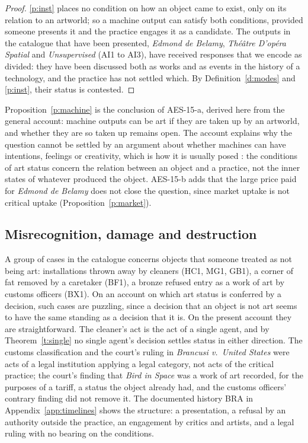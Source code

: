 \documentclass{situationist-preprint}
\begin{document}
\begin{proof}
\ref{p:inst} places no condition on how an object came to exist, only on its relation to an artworld; so a machine output can satisfy both conditions, provided someone presents it and the practice engages it as a candidate. The outputs in the catalogue that have been presented, \emph{Edmond de Belamy}, \emph{Th\'e\^atre D'op\'era Spatial} and \emph{Unsupervised} (AI1 to AI3), have received responses that we encode as divided: they have been discussed both as works and as events in the history of a technology, and the practice has not settled which. By Definition~\ref{d:modes} and \ref{p:inst}, their status is contested.
\end{proof}

Proposition~\ref{p:machine} is the conclusion of AES-15-a, derived here from the general account: machine outputs can be art if they are taken up by an artworld, and whether they are so taken up remains open. The account explains why the question cannot be settled by an argument about whether machines can have intentions, feelings or creativity, which is how it is usually posed \citep{Boden2010,Hertzmann2018}: the conditions of art status concern the relation between an object and a practice, not the inner states of whatever produced the object. AES-15-b adds that the large price paid for \emph{Edmond de Belamy} does not close the question, since market uptake is not critical uptake (Proposition~\ref{p:market}).

\subsection{Misrecognition, damage and destruction}

A group of cases in the catalogue concerns objects that someone treated as not being art: installations thrown away by cleaners (HC1, MG1, GB1), a corner of fat removed by a caretaker (BF1), a bronze refused entry as a work of art by customs officers (BX1). On an account on which art status is conferred by a decision, such cases are puzzling, since a decision that an object is not art seems to have the same standing as a decision that it is. On the present account they are straightforward. The cleaner's act is the act of a single agent, and by Theorem~\ref{t:single} no single agent's decision settles status in either direction. The customs classification and the court's ruling in \emph{Brancusi v.\ United States} were acts of a legal institution applying a legal category, not acts of the critical practice; the court's finding that \emph{Bird in Space} was a work of art recorded, for the purposes of a tariff, a status the object already had, and the customs officers' contrary finding did not remove it. The documented history BRA in Appendix~\ref{app:timelines} shows the structure: a presentation, a refusal by an authority outside the practice, an engagement by critics and artists, and a legal ruling with no bearing on the conditions.
\end{document}
